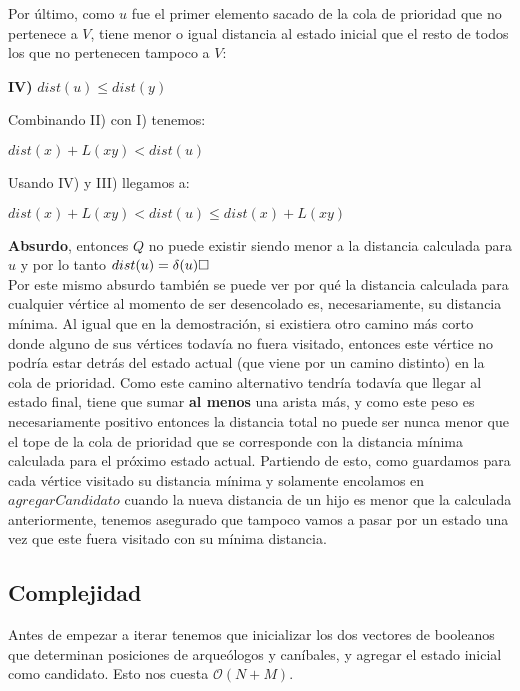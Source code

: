 Por último, como $u$ fue el primer elemento sacado de la cola de prioridad que no pertenece a $V$, tiene menor o igual distancia al estado inicial que el resto de todos los que no pertenecen tampoco a $V$:
\\
\begin{center}
\textbf{IV)} $dist(u) \le dist(y) $
\\
\end{center}
Combinando II) con I) tenemos:
\\
\begin{center}
$dist(x)+L(xy) < dist(u)$
\\
\end{center}
Usando IV) y III) llegamos a:
\\

\begin{center}
    $dist(x)+L(xy) < dist(u) \leq dist(x) + L(xy)$
\\
\end{center}
\textbf{Absurdo}, entonces $Q$ no puede existir siendo menor a la distancia calculada para $u$ y por lo tanto $dist(u) = \delta(u) \QEDB$
\\

Por este mismo absurdo también se puede ver por qué la distancia calculada para cualquier vértice al momento de ser desencolado es, necesariamente, su distancia mínima. Al igual que en la demostración, si existiera otro camino más corto donde alguno de sus vértices todavía no fuera visitado, entonces este vértice no podría estar detrás del estado actual (que viene por un camino distinto) en la cola de prioridad. Como este camino alternativo tendría todavía que llegar al estado final, tiene que sumar \textbf{al menos} una arista más, y como este peso es necesariamente positivo entonces la distancia total no puede ser nunca menor que el tope de la cola de prioridad que se corresponde con la distancia mínima calculada para el próximo estado actual. Partiendo de esto, como guardamos para cada vértice visitado su distancia mínima y solamente encolamos en $agregarCandidato$ cuando la nueva distancia de un hijo es menor que la calculada anteriormente, tenemos asegurado que tampoco vamos a pasar por un estado una vez que este fuera visitado con su mínima distancia.

\subsection{Complejidad}
Antes de empezar a iterar tenemos que inicializar los dos vectores de booleanos que determinan posiciones de arqueólogos y caníbales, y agregar el estado inicial como candidato. Esto nos cuesta $\mathcal{O}(N+M)$. \\

